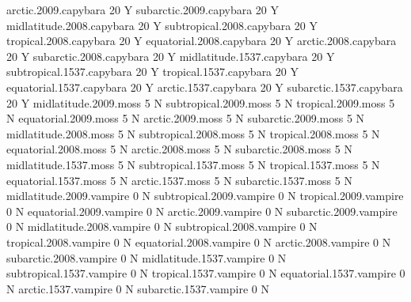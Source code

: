 \documentclass{article}
\numberwithin{exercise}{section}
\begin{document}
\begin{Schunk}
\begin{Soutput}
arctic.2009.capybara                  20          Y
subarctic.2009.capybara               20          Y
midlatitude.2008.capybara             20          Y
subtropical.2008.capybara             20          Y
tropical.2008.capybara                20          Y
equatorial.2008.capybara              20          Y
arctic.2008.capybara                  20          Y
subarctic.2008.capybara               20          Y
midlatitude.1537.capybara             20          Y
subtropical.1537.capybara             20          Y
tropical.1537.capybara                20          Y
equatorial.1537.capybara              20          Y
arctic.1537.capybara                  20          Y
subarctic.1537.capybara               20          Y
midlatitude.2009.moss                  5          N
subtropical.2009.moss                  5          N
tropical.2009.moss                     5          N
equatorial.2009.moss                   5          N
arctic.2009.moss                       5          N
subarctic.2009.moss                    5          N
midlatitude.2008.moss                  5          N
subtropical.2008.moss                  5          N
tropical.2008.moss                     5          N
equatorial.2008.moss                   5          N
arctic.2008.moss                       5          N
subarctic.2008.moss                    5          N
midlatitude.1537.moss                  5          N
subtropical.1537.moss                  5          N
tropical.1537.moss                     5          N
equatorial.1537.moss                   5          N
arctic.1537.moss                       5          N
subarctic.1537.moss                    5          N
midlatitude.2009.vampire               0          N
subtropical.2009.vampire               0          N
tropical.2009.vampire                  0          N
equatorial.2009.vampire                0          N
arctic.2009.vampire                    0          N
subarctic.2009.vampire                 0          N
midlatitude.2008.vampire               0          N
subtropical.2008.vampire               0          N
tropical.2008.vampire                  0          N
equatorial.2008.vampire                0          N
arctic.2008.vampire                    0          N
subarctic.2008.vampire                 0          N
midlatitude.1537.vampire               0          N
subtropical.1537.vampire               0          N
tropical.1537.vampire                  0          N
equatorial.1537.vampire                0          N
arctic.1537.vampire                    0          N
subarctic.1537.vampire                 0          N
\end{Soutput}
\end{Schunk}
\end{document}
